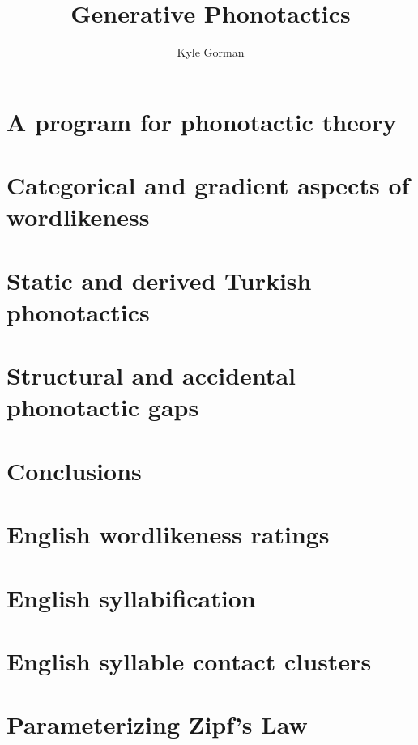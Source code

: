 \documentclass[12pt]{upenndiss}
\title{Generative Phonotactics}
\author{Kyle Gorman}
\begin{document}
\FrontMatter

\chapter{A program for phonotactic theory} 
\chapter{Categorical and gradient aspects of wordlikeness} 
\chapter{Static and derived Turkish phonotactics} 
\chapter{Structural and accidental phonotactic gaps} 
\chapter{Conclusions} 

\appendix 
\renewcommand{\arraystretch}{0.25}

\chapter{English wordlikeness ratings} 
\chapter{English syllabification} 
\chapter{English syllable contact clusters} 
\chapter{Parameterizing Zipf's Law} 



\end{document}
